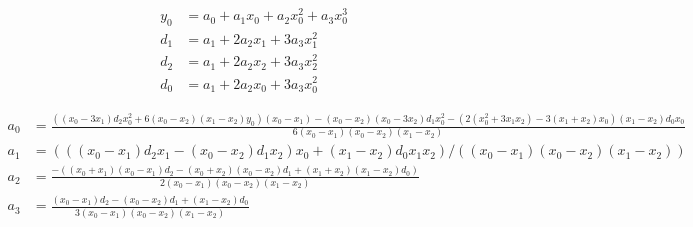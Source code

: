 \begin{align}
  y_0 & = a_0+a_1 x_0+a_2 x_0^{2}+a_3 x_0^{3}  \\
   d_1 & = a_1+2 a_2 x_1+3 a_3 x_1^{2}  \\
   d_2 & = a_1+2 a_2  x_2+3 a_3 x_2^{2}  \\
   d_0 & = a_1+2 a_2 x_0+3 a_3 x_0^{2}  
\end{align}

 
\begin{align}
   a_0 & = \frac
{\left(\left(x_0 - 3 x_1\right) d_2 x_0^{2}+6 \left(x_0 - x_2\right)  \left(x_1 - x_2\right) y_0\right) \left(x_0 - x_1\right) - \left(x_0 - x_2\right)  \left(x_0 - 3 x_2\right) d_1 x_0^{2} - \left(2 \left(x_0^{2}+3 x_1 x_2\right) - 3  \left(x_1+x_2\right) x_0\right) \left(x_1 - x_2\right) d_0 x_0}
{6  \left(x_0 - x_1\right) \left(x_0 - x_2\right) \left(x_1 - x_2\right)} \\
   a_1 & =  \left(\left(\left(x_0 - x_1\right) d_2 x_1 - \left(x_0 - x_2\right) d_1 x_2\right) x_0+ \left(x_1 - x_2\right) d_0 x_1 x_2\right)/\left(\left(x_0 - x_1\right) \left(x_0 - x_2 \right) \left(x_1 - x_2\right)\right)  \\
   a_2 & = \frac
{ - \left(\left(x_0+x_1\right)  \left(x_0 - x_1\right) d_2 - \left(x_0+x_2\right) \left(x_0 - x_2\right) d_1+\left(x_1+ x_2\right) \left(x_1 - x_2\right) d_0\right)}
{2 \left(x_0 - x_1\right)  \left(x_0 - x_2\right) \left(x_1 - x_2\right)} \\
   a_3 & = \frac
{\left(x_0 - x_1 \right) d_2 - \left(x_0 - x_2\right) d_1+\left(x_1 - x_2\right) d_0}
{3  \left(x_0 - x_1\right) \left(x_0 - x_2\right) \left(x_1 - x_2\right)} 
\end{align}
